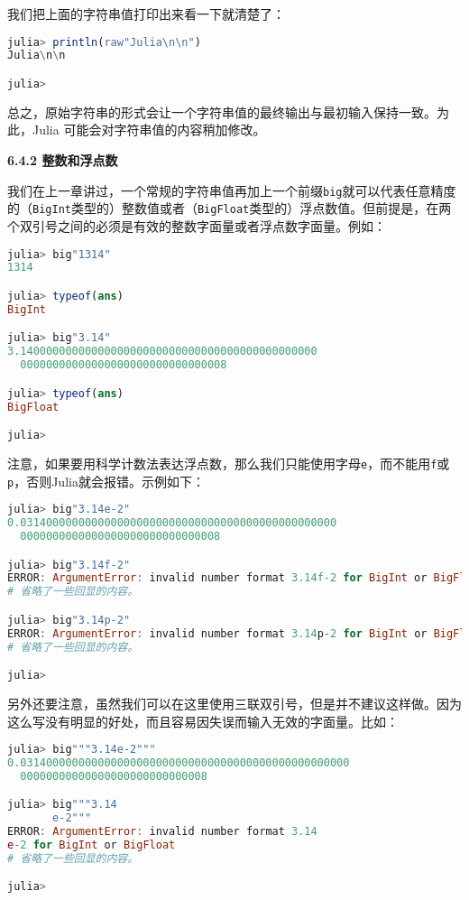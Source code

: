 我们把上面的字符串值打印出来看一下就清楚了：
\begin{lstlisting}[language=julia]
julia> println(raw"Julia\n\n")
Julia\n\n

julia> 
\end{lstlisting}

总之，原始字符串的形式会让一个字符串值的最终输出与最初输入保持一致。为此，Julia 可能会对字符串值的内容稍加修改。

\textbf{6.4.2 整数和浮点数}

我们在上一章讲过，一个常规的字符串值再加上一个前缀\verb|big|就可以代表任意精度的（\verb|BigInt|类型的）整数值或者（\verb|BigFloat|类型的）浮点数值。但前提是，在两个双引号之间的必须是有效的整数字面量或者浮点数字面量。例如：
\begin{lstlisting}[language=julia]
julia> big"1314"
1314

julia> typeof(ans)
BigInt

julia> big"3.14"
3.1400000000000000000000000000000000000000000000
  00000000000000000000000000000008

julia> typeof(ans)
BigFloat

julia> 
\end{lstlisting}

注意，如果要用科学计数法表达浮点数，那么我们只能使用字母\verb|e|，而不能用\verb|f|或\verb|p|，否则Julia就会报错。示例如下：
\begin{lstlisting}[language=julia]
julia> big"3.14e-2"
0.0314000000000000000000000000000000000000000000000
  0000000000000000000000000000008

julia> big"3.14f-2"
ERROR: ArgumentError: invalid number format 3.14f-2 for BigInt or BigFloat
# 省略了一些回显的内容。

julia> big"3.14p-2"
ERROR: ArgumentError: invalid number format 3.14p-2 for BigInt or BigFloat
# 省略了一些回显的内容。

julia> 
\end{lstlisting}

另外还要注意，虽然我们可以在这里使用三联双引号，但是并不建议这样做。因为这么写没有明显的好处，而且容易因失误而输入无效的字面量。比如：
\begin{lstlisting}[language=julia]
julia> big"""3.14e-2"""
0.031400000000000000000000000000000000000000000000000
  00000000000000000000000000008

julia> big"""3.14
       e-2"""
ERROR: ArgumentError: invalid number format 3.14
e-2 for BigInt or BigFloat
# 省略了一些回显的内容。

julia> 
\end{lstlisting}

